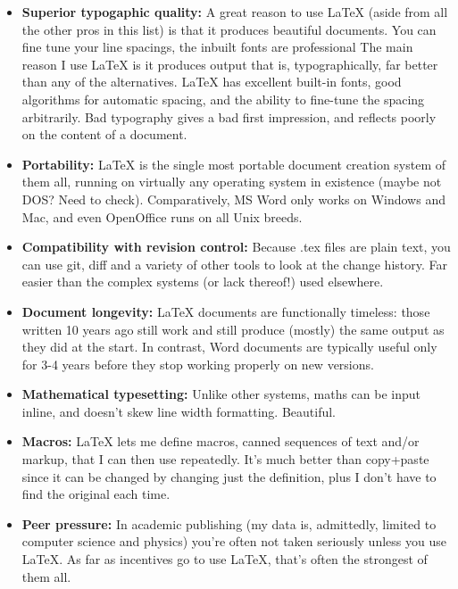 \documentclass{article}
\begin{document}
\begin{itemize}
\item \textbf{Superior typogaphic quality:} A great reason to use LaTeX (aside from all the other pros in this list) is that it produces beautiful documents. You can fine tune your line spacings, the inbuilt fonts are professional The main reason I use LaTeX is it produces output that is, typographically, far better than any of the alternatives. LaTeX has excellent built-in fonts, good algorithms for automatic spacing, and the ability to fine-tune the spacing arbitrarily. Bad typography gives a bad first impression, and reflects poorly on the content of a document.
\item \textbf{Portability:} LaTeX is the single most portable document creation system of them all, running on virtually any operating system in existence (maybe not DOS? Need to check). Comparatively, MS Word only works on Windows and Mac, and even OpenOffice runs on all Unix breeds.
\item \textbf{Compatibility with revision control:} Because .tex files are plain text, you can use git, diff and a variety of other tools to look at the change history. Far easier than the complex systems (or lack thereof!) used elsewhere. 
\item \textbf{Document longevity:} LaTeX documents are functionally timeless: those written 10 years ago still work and still produce (mostly) the same output as they did at the start. In contrast, Word documents are typically useful only for 3-4 years before they stop working properly on new versions.
\item \textbf{Mathematical typesetting:} Unlike other systems, maths can be input inline, and doesn’t skew line width formatting. Beautiful.
\item \textbf{Macros:} LaTeX lets me define macros, canned sequences of text and/or markup, that I can then use repeatedly. It's much better than copy+paste since it can be changed by changing just the definition, plus I don't have to find the original each time.
\item \textbf{Peer pressure:} In academic publishing (my data is, admittedly, limited to computer science and physics) you’re often not taken seriously unless you use LaTeX. As far as incentives go to use LaTeX, that’s often the strongest of them all. 
\end{itemize}
\end{document}
